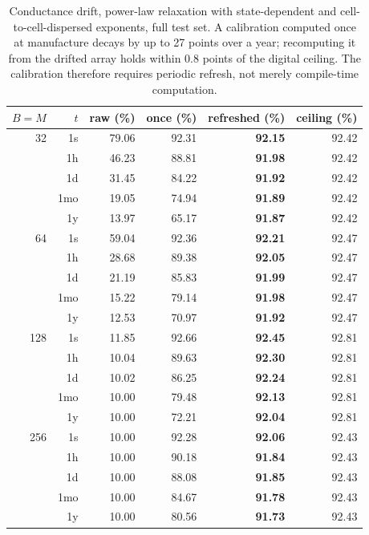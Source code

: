 \begin{table}[t]
\centering
\caption{Conductance drift, power-law relaxation with state-dependent and cell-to-cell-dispersed exponents, full test set. A calibration computed once at manufacture decays by up to 27 points over a year; recomputing it from the drifted array holds within 0.8 points of the digital ceiling. The calibration therefore requires periodic refresh, not merely compile-time computation.}
\label{tab:drift}
\begin{tabular}{rrrrrr}
\toprule
$B{=}M$ & $t$ & raw (\%) & once (\%) & refreshed (\%) & ceiling (\%) \\
\midrule
32 & 1s & 79.06 & 92.31 & \textbf{92.15} & 92.42 \\
 & 1h & 46.23 & 88.81 & \textbf{91.98} & 92.42 \\
 & 1d & 31.45 & 84.22 & \textbf{91.92} & 92.42 \\
 & 1mo & 19.05 & 74.94 & \textbf{91.89} & 92.42 \\
 & 1y & 13.97 & 65.17 & \textbf{91.87} & 92.42 \\
\midrule
64 & 1s & 59.04 & 92.36 & \textbf{92.21} & 92.47 \\
 & 1h & 28.68 & 89.38 & \textbf{92.05} & 92.47 \\
 & 1d & 21.19 & 85.83 & \textbf{91.99} & 92.47 \\
 & 1mo & 15.22 & 79.14 & \textbf{91.98} & 92.47 \\
 & 1y & 12.53 & 70.97 & \textbf{91.92} & 92.47 \\
\midrule
128 & 1s & 11.85 & 92.66 & \textbf{92.45} & 92.81 \\
 & 1h & 10.04 & 89.63 & \textbf{92.30} & 92.81 \\
 & 1d & 10.02 & 86.25 & \textbf{92.24} & 92.81 \\
 & 1mo & 10.00 & 79.48 & \textbf{92.13} & 92.81 \\
 & 1y & 10.00 & 72.21 & \textbf{92.04} & 92.81 \\
\midrule
256 & 1s & 10.00 & 92.28 & \textbf{92.06} & 92.43 \\
 & 1h & 10.00 & 90.18 & \textbf{91.84} & 92.43 \\
 & 1d & 10.00 & 88.08 & \textbf{91.85} & 92.43 \\
 & 1mo & 10.00 & 84.67 & \textbf{91.78} & 92.43 \\
 & 1y & 10.00 & 80.56 & \textbf{91.73} & 92.43 \\
\bottomrule
\end{tabular}
\end{table}
